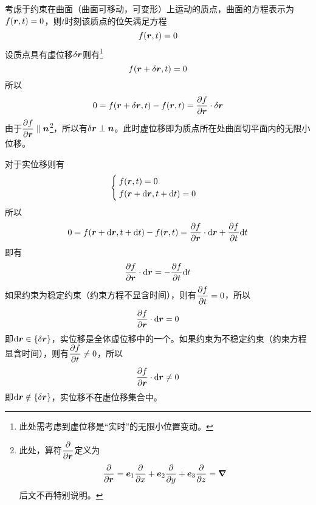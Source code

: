 考虑于约束在曲面（曲面可移动，可变形）上运动的质点，曲面的方程表示为$f(\boldsymbol{r},t)=0$，则$t$时刻该质点的位矢满足方程
\begin{equation*}
	f(\boldsymbol{r},t) = 0
\end{equation*}
设质点具有虚位移$\delta \boldsymbol{r}$则有\footnote{此处需考虑到虚位移是“实时”的无限小位置变动。}
\begin{equation*}
	f(\boldsymbol{r}+\delta \boldsymbol{r},t) = 0
\end{equation*}
所以
\begin{equation*}
	0 = f(\boldsymbol{r}+\delta \boldsymbol{r},t)-f(\boldsymbol{r},t) = \frac{\partial f}{\partial \boldsymbol{r}} \cdot \delta \boldsymbol{r}
\end{equation*}
由于$\dfrac{\partial f}{\partial \boldsymbol{r}} \parallel \boldsymbol{n}$\footnote{此处，算符$\dfrac{\partial}{\partial \boldsymbol{r}}$定义为\begin{equation*} \frac{\partial}{\partial \boldsymbol{r}} = \boldsymbol{e}_1 \frac{\partial}{\partial x}+\boldsymbol{e}_2 \frac{\partial}{\partial y}+\boldsymbol{e}_3 \frac{\partial}{\partial z} = \boldsymbol{\nabla} \end{equation*}后文不再特别说明。}，所以有$\delta \boldsymbol{r} \perp \boldsymbol{n}$。此时虚位移即为质点所在处曲面切平面内的无限小位移。

对于实位移则有
\begin{equation*}
	\begin{cases}
		f(\boldsymbol{r},t) = 0 \\
		f(\boldsymbol{r}+\mathrm{d} \boldsymbol{r},t+\mathrm{d} t) = 0
	\end{cases}
\end{equation*}
所以
\begin{equation*}
	0 = f(\boldsymbol{r}+\mathrm{d} \boldsymbol{r},t+\mathrm{d} t) - f(\boldsymbol{r},t) = \frac{\partial f}{\partial \boldsymbol{r}} \cdot \mathrm{d}\boldsymbol{r} + \frac{\partial f}{\partial t} \mathrm{d} t
\end{equation*}
即有
\begin{equation*}
	\frac{\partial f}{\partial \boldsymbol{r}} \cdot \mathrm{d} \boldsymbol{r} = - \frac{\partial f}{\partial t} \mathrm{d} t
\end{equation*}
如果约束为{\heiti 稳定约束}（约束方程不显含时间），则有$\dfrac{\partial f}{\partial t} = 0$，所以
\begin{equation*}
	\frac{\partial f}{\partial \boldsymbol{r}} \cdot \mathrm{d} \boldsymbol{r} = 0
\end{equation*}
即$\mathrm{d} \boldsymbol{r} \in \{\delta \boldsymbol{r}\}$，实位移是全体虚位移中的一个。如果约束为{\heiti 不稳定约束}（约束方程显含时间），则有$\dfrac{\partial f}{\partial t} \neq 0$，所以
\begin{equation*}
	\frac{\partial f}{\partial \boldsymbol{r}} \cdot \mathrm{d} \boldsymbol{r} \neq 0
\end{equation*}
即$\mathrm{d} \boldsymbol{r} \notin \{\delta \boldsymbol{r}\}$，实位移不在虚位移集合中。

